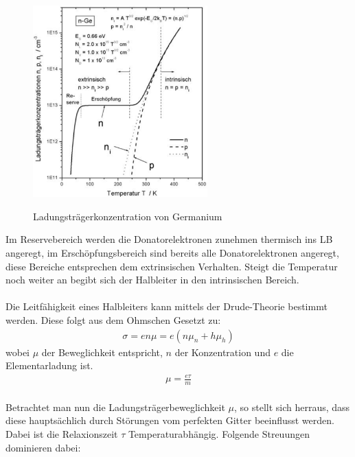 \begin{figure}
    \centering
    \caption{Ladungsträgerkonzentration von Germanium}
    \includegraphics[width=0.6\textwidth]{./fig/ladung_ger.png}
    \label{fig:gerdot}
\end{figure}
Im Reservebereich werden die Donatorelektronen zunehmen thermisch ins LB angeregt, im Erschöpfungsbereich sind bereits alle Donatorelektronen angeregt, diese Bereiche entsprechen dem extrinsischen Verhalten. Steigt die Temperatur noch weiter an begibt sich der Halbleiter in den intrinsischen Bereich. 
\\
\\
Die Leitfähigkeit eines Halbleiters kann mittels der Drude-Theorie bestimmt werden. Diese folgt aus dem Ohmschen Gesetzt zu:
\begin{align}
    \sigma = en\mu = e( n\mu_n + h \mu_h)
\end{align}
wobei $\mu$ der Beweglichkeit entspricht, $n$ der Konzentration und $e$ die Elementarladung ist. 
\begin{align}
    \mu = \frac{e\tau}{m}
\end{align}
\\ 
Betrachtet man nun die Ladungsträgerbeweglichkeit $\mu$, so stellt sich herraus, dass diese hauptsächlich durch Störungen vom perfekten Gitter beeinflusst werden. Dabei ist die Relaxionszeit $\tau$ Temperaturabhängig. Folgende Streuungen dominieren dabei:
